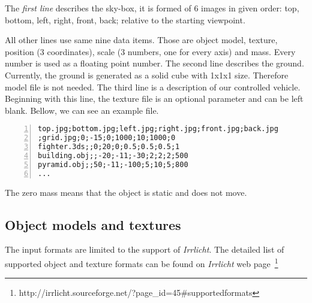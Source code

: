 The \emph{first line} describes the sky-box, it is formed of 6 images in given order: top, bottom, left, right, front, back; relative to the starting viewpoint. 

All other lines use same nine data items. Those are object model, texture, position (3 coordinates), scale (3 numbers, one for every axis) and mass. Every number is used as a floating point number.
The second line describes the ground. Currently, the ground is generated as a solid cube with 1x1x1 size. Therefore model file is not needed. The third line is a description of our controlled vehicle. Beginning with this line, the texture file is an optional parameter and can be left blank. Bellow, we can see an example file.

\begin{centering}
\begin{Verbatim}[frame=single,numbers=left,xleftmargin=5mm]
top.jpg;bottom.jpg;left.jpg;right.jpg;front.jpg;back.jpg
;grid.jpg;0;-15;0;1000;10;1000;0
fighter.3ds;;0;20;0;0.5;0.5;0.5;1
building.obj;;-20;-11;-30;2;2;2;500
pyramid.obj;;50;-11;-100;5;10;5;800
...
\end{Verbatim}
\end{centering}
The zero mass means that the object is static and does not move.

\subsection*{Object models and textures}
The input formats are limited to the support of \emph{Irrlicht}. The detailed list of supported object and texture formats can be found on \emph{Irrlicht} web page~\footnote{http://irrlicht.sourceforge.net/?page\_id=45\#supportedformats}



